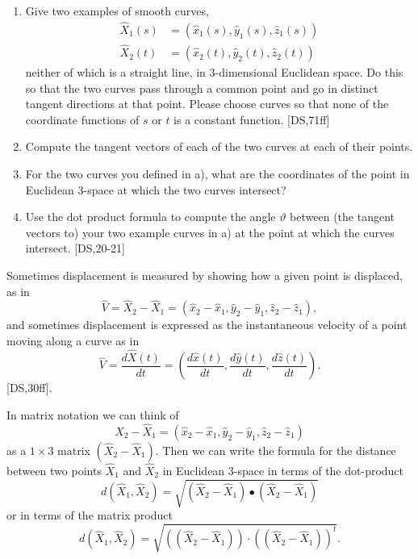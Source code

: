 \documentclass{ximera}
\begin{document}
\begin{exercise}\hfil
\begin{enumerate}
\label{1}\item Give two examples of smooth curves,
\begin{align*}
\hat{X}_{1}\left(  s\right)   &  =\left(  \hat{x}_{1}\left(  s\right)
,\hat{y}_{1}\left(  s\right)  ,\hat{z}_{1}\left(  s\right)  \right) \\
\hat{X}_{2}\left(  t\right)   &  =\left(  \hat{x}_{2}\left(  t\right)
,\hat{y}_{2}\left(  t\right)  ,\hat{z}_{2}\left(  t\right)  \right)
\end{align*}
neither of which is a straight line, in $3$-dimensional Euclidean space. Do
this so that the two curves pass through a common point and go in distinct
tangent directions at that point. Please choose curves so that none of the
coordinate functions of $s$ or $t$ is a constant function. [DS,71ff]

\item Compute the tangent vectors of each of the two curves at each of their points.

\item For the two curves you defined in a), what are the coordinates of the point
in Euclidean $3$-space at which the two curves intersect?

\item Use the dot product formula to compute the angle $\vartheta$ between (the
tangent vectors to) your two example curves in a) at the point at which the
curves intersect. [DS,20-21]
\end{enumerate}
\end{exercise}

Sometimes displacement is measured by showing how a given point is displaced,
as in%
\[
\hat{V}=\hat{X}_{2}-\hat{X}_{1}=\left(  \hat{x}_{2}-\hat{x}_{1},\hat{y}%
_{2}-\hat{y}_{1},\hat{z}_{2}-\hat{z}_{1}\right)  ,
\]
and sometimes displacement is expressed as the instantaneous velocity of a
point moving along a curve as in%
\[
\hat{V}=\frac{d\hat{X}\left(  t\right)  }{dt}=\left(  \frac{d\hat{x}\left(
t\right)  }{dt},\frac{d\hat{y}\left(  t\right)  }{dt},\frac{d\hat{z}\left(
t\right)  }{dt}\right)  .
\]
[DS,30ff].

In matrix notation we can think of
\[
\hat{X}_{2}-\hat{X}_{1}=\left(  \hat{x}_{2}-\hat{x}_{1},\hat{y}_{2}-\hat
{y}_{1},\hat{z}_{2}-\hat{z}_{1}\right)
\]
as a $1\times3$ matrix $\left(  \hat{X}_{2}-\hat{X}_{1}\right)  $. Then we can
write the formula for the distance between two points $\hat{X}_{1}$ and
$\hat{X}_{2}$ in Euclidean $3$-space in terms of the dot-product%
\begin{equation}
d\left(  \hat{X}_{1},\hat{X}_{2}\right)  =\sqrt{\left(  \hat{X}_{2}-\hat
{X}_{1}\right)  \bullet\left(  \hat{X}_{2}-\hat{X}_{1}\right)  } \label{13}%
\end{equation}
or in terms of the matrix product%
\[
d\left(  \hat{X}_{1},\hat{X}_{2}\right)  =\sqrt{\left(  \left(  \hat{X}%
_{2}-\hat{X}_{1}\right)  \right)  \cdot\left(  \left(  \hat{X}_{2}-\hat{X}%
_{1}\right)  \right)  ^{t}}.
\]
\end{document}
